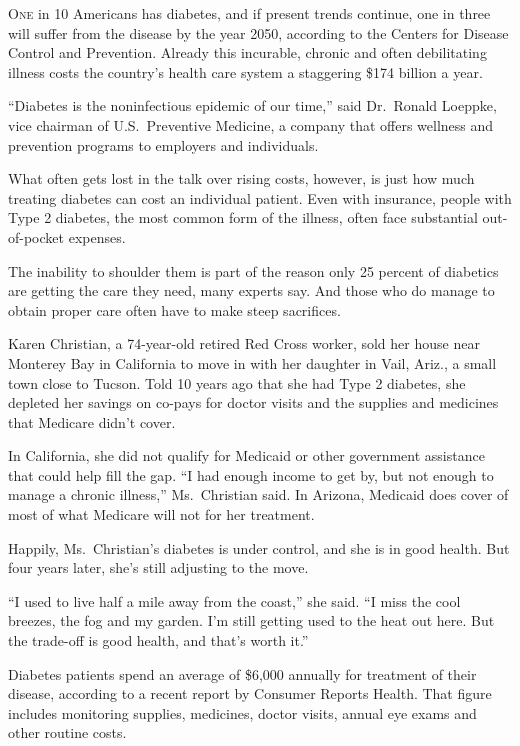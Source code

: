 ﻿\documentclass[12pt]{article}
\begin{document}
\lettrine{O}{ne} in 10 Americans has diabetes, and if present trends
continue, one in three will suffer from the disease by the year 2050, according to the Centers for
Disease Control and Prevention. Already this incurable, chronic and often debilitating illness costs
the country's health care system a staggering \$174 billion a year.

``Diabetes is the noninfectious epidemic of our time,'' said Dr.~Ronald Loeppke, vice chairman of
U.S.~Preventive Medicine, a company that offers wellness and prevention programs to employers and
individuals.

What often gets lost in the talk over rising costs, however, is just how much treating diabetes can
cost an individual patient. Even with insurance, people with Type 2 diabetes, the most common form
of the illness, often face substantial out-of-pocket expenses.

The inability to shoulder them is part of the reason only 25 percent of diabetics are getting the
care they need, many experts say. And those who do manage to obtain proper care often have to make
steep sacrifices.

Karen Christian, a 74-year-old retired Red Cross worker, sold her house near Monterey Bay in
California to move in with her daughter in Vail, Ariz., a small town close to Tucson. Told 10 years
ago that she had Type 2 diabetes, she depleted her savings on co-pays for doctor visits and the
supplies and medicines that Medicare didn't cover.

In California, she did not qualify for Medicaid or other government assistance that could help fill
the gap. ``I had enough income to get by, but not enough to manage a chronic illness,''
Ms.~Christian said. In Arizona, Medicaid does cover of most of what Medicare will not for her
treatment.

Happily, Ms.~Christian's diabetes is under control, and she is in good health. But four years later,
she's still adjusting to the move.

``I used to live half a mile away from the coast,'' she said. ``I miss the cool breezes, the fog and
my garden. I'm still getting used to the heat out here. But the trade-off is good health, and that's
worth it.''

Diabetes patients spend an average of \$6,000 annually for treatment of their disease, according to
a recent report by Consumer Reports Health. That figure includes monitoring supplies, medicines,
doctor visits, annual eye exams and other routine costs.
\end{document}
